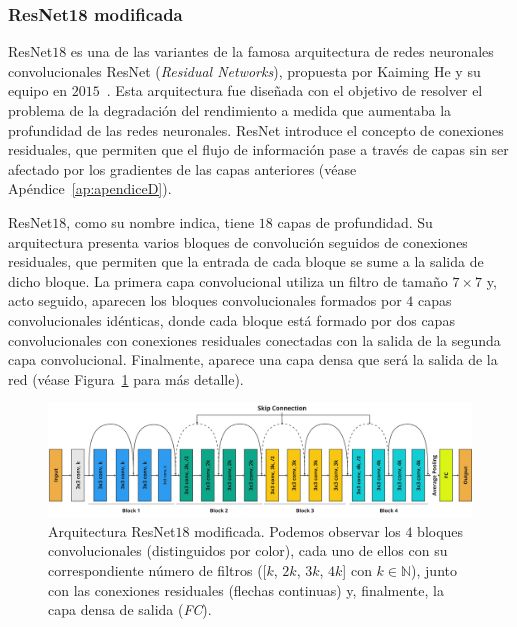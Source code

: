 \subsubsection{ResNet18 modificada}\label{subsubsec:resnet18-modificada}

ResNet$18$ es una de las variantes de la famosa arquitectura de redes neuronales convolucionales ResNet (\textit{Residual Networks}), propuesta por Kaiming He y su equipo en $2015$~\cite{He2015}. Esta arquitectura fue diseñada con el objetivo de resolver el problema de la degradación del rendimiento a medida que aumentaba la profundidad de las redes neuronales. ResNet introduce el concepto de conexiones residuales, que permiten que el flujo de información pase a través de capas sin ser afectado por los gradientes de las capas anteriores (véase Apéndice~\ref{ap:apendiceD}).

ResNet$18$, como su nombre indica, tiene $18$ capas de profundidad. Su arquitectura presenta varios bloques de convolución seguidos de conexiones residuales, que permiten que la entrada de cada bloque se sume a la salida de dicho bloque. La primera capa convolucional utiliza un filtro de tamaño $7 \times 7$ y, acto seguido, aparecen los bloques convolucionales formados por $4$ capas convolucionales idénticas, donde cada bloque está formado por dos capas convolucionales con conexiones residuales conectadas con la salida de la segunda capa convolucional. Finalmente, aparece una capa densa que será la salida de la red (véase Figura~\ref{fig:resnet18} para más detalle).

\begin{figure}[h]
    \centering
    \includegraphics[width=\linewidth]{img/experiments/resnet18modified.png}
    \caption[Arquitectura ResNet$18$ modificada.]{Arquitectura ResNet$18$ modificada. Podemos observar los $4$ bloques convolucionales (distinguidos por color), cada uno de ellos con su correspondiente número de filtros ([$k$, $2k$, $3k$, $4k$] con $k \in \mathbb{N}$), junto con las conexiones residuales (flechas continuas) y, finalmente, la capa densa de salida (\textit{FC}).}\label{fig:resnet18}
\end{figure}

